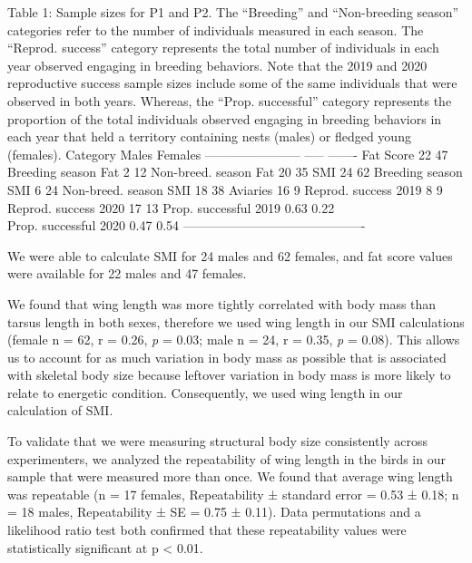 \documentclass[
]{article}
\begin{document}
Table 1: Sample sizes for P1 and P2. The ``Breeding'' and ``Non-breeding
season'' categories refer to the number of individuals measured in each
season. The ``Reprod. success'' category represents the total number of
individuals in each year observed engaging in breeding behaviors. Note
that the 2019 and 2020 reproductive success sample sizes include some of
the same individuals that were observed in both years. Whereas, the
``Prop. successful'' category represents the proportion of the total
individuals observed engaging in breeding behaviors in each year that
held a territory containing nests (males) or fledged young (females).
Category \textbar{} Males \textbar{} Females \textbar{}
----------------------- \textbar{} ----- \textbar{} ------- \textbar{}
Fat Score \textbar{} 22 \textbar{} 47 \textbar{} Breeding season Fat
\textbar{} 2 \textbar{} 12 \textbar{} Non-breed. season Fat \textbar{}
20 \textbar{} 35 \textbar{} SMI \textbar{} 24 \textbar{} 62 \textbar{}
Breeding season SMI \textbar{} 6 \textbar{} 24 \textbar{} Non-breed.
season SMI \textbar{} 18 \textbar{} 38 \textbar{} Aviaries \textbar{} 16
\textbar{} 9 \textbar{} Reprod. success 2019 \textbar{} 8 \textbar{} 9
\textbar{} Reprod. success 2020 \textbar{} 17 \textbar{} 13 \textbar{}
Prop. successful 2019 \textbar{} 0.63 \textbar{} 0.22 \textbar{}\\
Prop. successful 2020 \textbar{} 0.47 \textbar{} 0.54 \textbar{}
-------------------------------------------

We were able to calculate SMI for 24 males and 62 females, and fat score
values were available for 22 males and 47 females.

We found that wing length was more tightly correlated with body mass
than tarsus length in both sexes, therefore we used wing length in our
SMI calculations (female n = 62, r = 0.26, \emph{p} = 0.03; male n = 24,
r = 0.35, \emph{p} = 0.08). This allows us to account for as much
variation in body mass as possible that is associated with skeletal body
size because leftover variation in body mass is more likely to relate to
energetic condition. Consequently, we used wing length in our
calculation of SMI.

To validate that we were measuring structural body size consistently
across experimenters, we analyzed the repeatability of wing length in
the birds in our sample that were measured more than once. We found that
average wing length was repeatable (n = 17 females, Repeatability ±
standard error = 0.53 ± 0.18; n = 18 males, Repeatability ± SE = 0.75 ±
0.11). Data permutations and a likelihood ratio test both confirmed that
these repeatability values were statistically significant at p
\textless{} 0.01.
\end{document}
